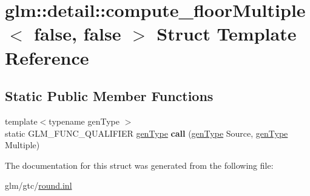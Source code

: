\hypertarget{structglm_1_1detail_1_1compute__floorMultiple_3_01false_00_01false_01_4}{\section{glm\-:\-:detail\-:\-:compute\-\_\-floor\-Multiple$<$ false, false $>$ Struct Template Reference}
\label{structglm_1_1detail_1_1compute__floorMultiple_3_01false_00_01false_01_4}
}
\subsection*{Static Public Member Functions}
\begin{DoxyCompactItemize}
\item 
\hypertarget{structglm_1_1detail_1_1compute__floorMultiple_3_01false_00_01false_01_4_a795b0efa8ebff0dcbbc055cdccd2156c}{{\footnotesize template$<$typename gen\-Type $>$ }\\static G\-L\-M\-\_\-\-F\-U\-N\-C\-\_\-\-Q\-U\-A\-L\-I\-F\-I\-E\-R \hyperlink{structglm_1_1detail_1_1genType}{gen\-Type} {\bfseries call} (\hyperlink{structglm_1_1detail_1_1genType}{gen\-Type} Source, \hyperlink{structglm_1_1detail_1_1genType}{gen\-Type} Multiple)}\label{structglm_1_1detail_1_1compute__floorMultiple_3_01false_00_01false_01_4_a795b0efa8ebff0dcbbc055cdccd2156c}

\end{DoxyCompactItemize}


The documentation for this struct was generated from the following file\-:\begin{DoxyCompactItemize}
\item 
glm/gtc/\hyperlink{round_8inl}{round.\-inl}\end{DoxyCompactItemize}
